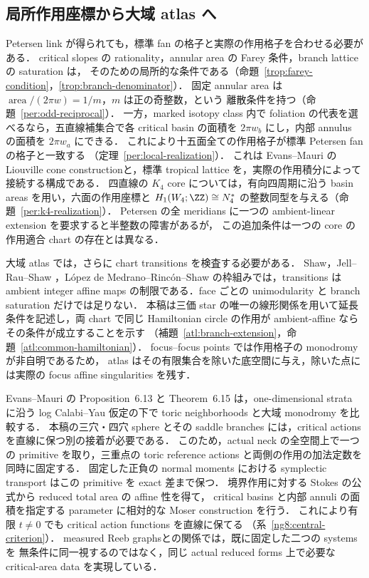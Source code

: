 \subsection{局所作用座標から大域 atlas へ}

Petersen link が得られても，標準 fan の格子と実際の作用格子を合わせる必要がある．
critical slopes の rationality，annular area の Farey 条件，branch lattice の saturation は，
そのための局所的な条件である（命題~\ref{trop:farey-condition}，\ref{trop:branch-denominator}）．
固定 annular area は $\operatorname{area}/(2\pi w)=1/m$，$m$ は正の奇整数，という
離散条件を持つ（命題~\ref{per:odd-reciprocal}）．
一方，marked isotopy class 内で foliation の代表を選べるなら，五直線補集合で各 critical
basin の面積を $2\pi w_b$ にし，内部 annulus の面積を $2\pi w_a$ にできる．
これにより十五面全ての作用格子が標準 Petersen fan の格子と一致する
（定理~\ref{per:local-realization}）．
これは Evans--Mauri の Liouville cone construction\cite{EM}と，標準 tropical lattice
\cite{GKM}を，実際の作用積分によって接続する構成である．
四直線の $K_4$ core については，有向四周期に沿う basin areas を用い，六面の作用座標と
$H_1(W_4;\ZZ)\cong N_4^*$ の整数同型を与える（命題~\ref{per:k4-realization}）．
Petersen の全 meridians に一つの ambient-linear extension を要求すると半整数の障害があるが，
この追加条件は一つの core の作用適合 chart の存在とは異なる．

大域 atlas では，さらに chart transitions を検査する必要がある．
Shaw\cite[Definition~3.1]{ShawSurfaces}，Jell--Rau--Shaw
\cite[Definitions~2.1, 3.1, 5.1]{JellRauShaw}，L\'opez de Medrano--Rinc\'on--Shaw
\cite[Definitions~2.2--2.4]{LRSChern}の枠組みでは，transitions は ambient integer affine maps
の制限である．face ごとの unimodularity と branch saturation だけでは足りない．
本稿は三価 star の唯一の線形関係を用いて延長条件を記述し，両 chart で同じ Hamiltonian
circle の作用が ambient-affine ならその条件が成立することを示す
（補題~\ref{atl:branch-extension}，命題~\ref{atl:common-hamiltonian}）．
focus--focus points では作用格子の monodromy が非自明である\cite[Remark~3.1]{VuNgoc}ため，
atlas はその有限集合を除いた底空間に与え，除いた点には実際の focus affine singularities を残す．

Evans--Mauri の Proposition~6.13 と Theorem~6.15 は，one-dimensional strata に沿う
log Calabi--Yau 仮定の下で toric neighborhoods と大域 monodromy を比較する\cite{EM}．
本稿の三穴・四穴 sphere とその saddle branches には，critical actions を直線に保つ別の接着が必要である．
このため，actual neck の全空間上で一つの primitive を取り，三重点の toric reference actions
と両側の作用の加法定数を同時に固定する．
固定した正負の normal moments における symplectic transport はこの primitive を exact 差まで保つ．
境界作用に対する Stokes の公式から reduced total area の affine 性を得て，
critical basins と内部 annuli の面積を指定する parameter に相対的な Moser construction を行う．
これにより有限 $t\ne0$ でも critical action functions を直線に保てる
（系~\ref{ng8:central-criterion}）．
measured Reeb graphs\cite{DMT,IKM}との関係では，既に固定した二つの systems を
無条件に同一視するのではなく，同じ actual reduced forms 上で必要な critical-area data を実現している．


